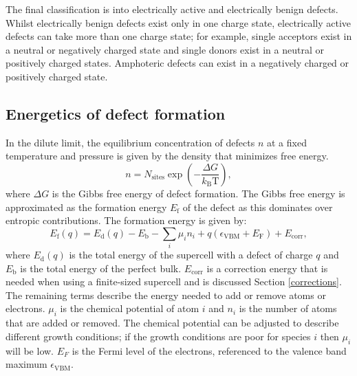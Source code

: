 The final classification is into electrically active and electrically benign defects. Whilst electrically benign defects exist only in one charge state, electrically active defects can take more than one charge state; for example, single acceptors exist in a neutral or negatively charged state and single donors exist in a neutral or positively charged states. Amphoteric defects can exist in a negatively charged or positively charged state.

\subsection{Energetics of defect formation} \label{defectformation}

In the dilute limit, the equilibrium concentration of defects $n$ at a fixed temperature and pressure is given by the density that minimizes free energy.
\begin{equation} \label{defectconcentration}
    n = N_\mathrm{sites} \exp \left(-\frac{\Delta G}{k_\mathrm{B} \mathrm{T}} \right),
\end{equation}
where $\Delta G$ is the Gibbs free energy of defect formation. The Gibbs free energy is approximated as the formation energy $E_\mathrm{f}$ of the defect as this dominates over entropic contributions. The formation energy is given by:
\begin{equation} \label{eqn_formation_energy}
E_\mathrm{f}(q) = E_\mathrm{d}(q) - E_\mathrm{b} - \sum_i \mu_i n_i + q(\epsilon_\mathrm{VBM}+E_\mathrm{F}) + E_\mathrm{corr},
\end{equation}
where $E_\mathrm{d}(q)$ is the total energy of the supercell with a defect of charge $q$ and $E_\mathrm{b}$ is the total energy of the perfect bulk. 
$E_\mathrm{corr}$ is a correction energy that is needed when using a finite-sized supercell and is discussed Section \ref{corrections}.
The remaining terms describe the energy needed to add or remove atoms or electrons.
$\mu_i$ is the chemical potential of atom $i$ and $n_i$ is the number of atoms that are added or removed.
The chemical potential can be adjusted to describe different growth conditions; if the growth conditions are poor for species $i$ then $\mu_i$ will be low.
$E_F$ is the Fermi level of the electrons, referenced to the valence band maximum $\epsilon_\mathrm{VBM}$.

